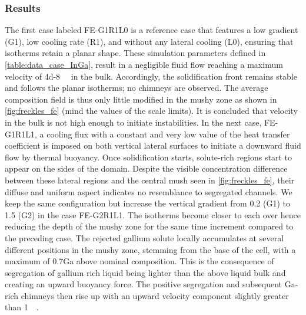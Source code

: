 \subsubsection{Results}
The first case labeled FE-G1R1L0 is a reference case that features a low gradient (G1), low cooling rate (R1), 
and without any lateral cooling (L0), ensuring that isotherms retain a planar shape. These simulation parameters 
defined in \cref{table:data_case_InGa}, result in a negligible fluid flow reaching a maximum velocity of \SI{4d-8}{\milli\uvelocity} in the bulk. 
Accordingly, the solidification front remains stable and follows the planar isotherms; no chimneys are observed. 
The average composition field is thus only little modified in the mushy zone as shown in \cref{fig:freckles_fe} (mind the values of the scale limits). 
It is concluded that velocity in the bulk is not high enough to initiate instabilities. In the next case, FE-G1R1L1, 
a cooling flux with a constant and very low value of the heat transfer coefficient is imposed on both vertical lateral 
surfaces to initiate a downward fluid flow by thermal buoyancy. Once solidification starts, solute-rich regions start 
to appear on the sides of the domain. Despite the visible concentration difference between these lateral regions and 
the central mush seen in \cref{fig:freckles_fe}, their diffuse and uniform aspect indicates no resemblance to segregated channels. We keep the 
same configuration but increase the vertical gradient from \SI{0.2}{\ugradT} (G1) to \SI{1.5}{\ugradT} (G2) in the case FE-G2R1L1. 
The isotherms become closer to each over hence reducing the depth of the mushy zone for the same time increment compared 
to the preceding case. The rejected gallium solute locally accumulates at several different positions in the mushy zone, 
stemming from the base of the cell, with a maximum of \SI{0.7}{\ucomposition}Ga above nominal composition. 
This is the consequence of segregation of gallium rich liquid being lighter than the above liquid bulk and creating an 
upward buoyancy force. The positive segregation and subsequent Ga-rich chimneys then rise up with an upward velocity 
component slightly greater than \SI{1}{\milli\uvelocity}.
%
